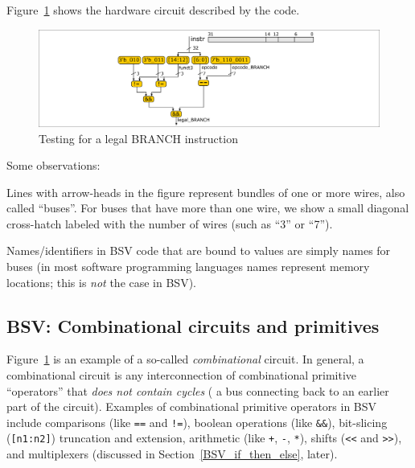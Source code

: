Figure~\ref{Fig_Combo_Is_Legal_BRANCH} shows the hardware circuit described by the code.
\begin{figure}[htbp]
  \centerline{\includegraphics[width=6in,angle=0]{ch040_Combo_Circuits/Figures/Fig_Combo_Is_Legal_BRANCH}}
  \caption{\label{Fig_Combo_Is_Legal_BRANCH}Testing for a legal BRANCH instruction}
\end{figure}
Some observations:
\begin{tightlist}

 \item Lines with arrow-heads in the figure represent bundles of one
   or more wires, also called ``buses''.  For buses that have more
   than one wire, we show a small diagonal cross-hatch labeled with
   the number of wires (such as ``3'' or ``7'').

 \item Names/identifiers in BSV code that are bound to values are
   simply names for buses (in most software programming languages
   names represent memory locations; this is \emph{not} the case in
   BSV).

\end{tightlist}


\subsection{BSV: Combinational circuits and primitives}


Figure~\ref{Fig_Combo_Is_Legal_BRANCH} is an example of a so-called
\emph{combinational} circuit.  In general, a combinational circuit is
any interconnection of combinational primitive ``operators'' that
\emph{does not contain cycles} ({\ie} a bus connecting back to an
earlier part of the circuit).  Examples of combinational primitive
operators in BSV include comparisons (like \verb|==| and \verb|!=|),
boolean operations (like \verb|&&|), bit-slicing (\verb|[n1:n2]|)
truncation and extension, arithmetic (like \verb|+|, \verb|-|,
\verb|*|), shifts (\verb|<<| and \verb|>>|), and multiplexers
(discussed in Section~\ref{BSV_if_then_else}, later).

